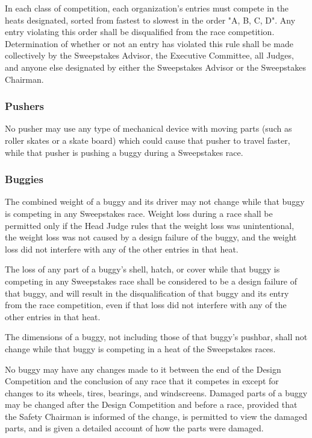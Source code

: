 	In each class of competition, each organization's entries must compete in the heats designated, sorted from fastest to slowest in the order "A, B, C, D". Any entry violating this order shall be disqualified from the race competition. Determination of whether or not an entry has violated this rule shall be made collectively by the Sweepstakes Advisor, the Executive Committee, all Judges, and anyone else designated by either the Sweepstakes Advisor or the Sweepstakes Chairman.

\subsubsection{Pushers}

	No pusher may use any type of mechanical device with moving parts (such as roller skates or a skate board) which could cause that pusher to travel faster, while that pusher is pushing a buggy during a Sweepstakes race.

\subsubsection{Buggies}

	The combined weight of a buggy and its driver may not change while that buggy is competing in any Sweepstakes race. Weight loss during a race shall be permitted only if the Head Judge rules that the weight loss was unintentional, the weight loss was not caused by a design failure of the buggy, and the weight loss did not interfere with any of the other entries in that heat.

	The loss of any part of a buggy's shell, hatch, or cover while that buggy is competing in any Sweepstakes race shall be considered to be a design failure of that buggy, and will result in the disqualification of that buggy and its entry from the race competition, even if that loss did not interfere with any of the other entries in that heat.

	The dimensions of a buggy, not including those of that buggy's pushbar, shall not change while that buggy is competing in a heat of the Sweepstakes races.

	No buggy may have any changes made to it between the end of the Design Competition and the conclusion of any race that it competes in except for changes to its wheels, tires, bearings, and windscreens. Damaged parts of a buggy may be changed after the Design Competition and before a race, provided that the Safety Chairman is informed of the change, is permitted to view the damaged parts, and is given a detailed account of how the parts were damaged.

